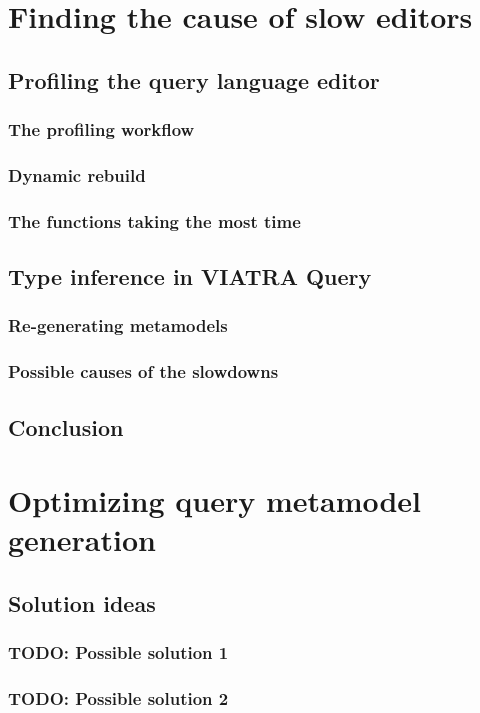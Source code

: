 \documentclass[11pt,a4paper,oneside]{report}
\begin{document}
\chapter{Finding the cause of slow editors}
\section{Profiling the query language editor}
\subsection{The profiling workflow}
\subsection{Dynamic rebuild}
\subsection{The functions taking the most time}
\section{Type inference in VIATRA Query}
\subsection{Re-generating metamodels}
\subsection{Possible causes of the slowdowns}
\section{Conclusion}

\chapter{Optimizing query metamodel generation}
\section{Solution ideas}
\subsection{TODO: Possible solution 1}
\subsection{TODO: Possible solution 2}
\end{document}
